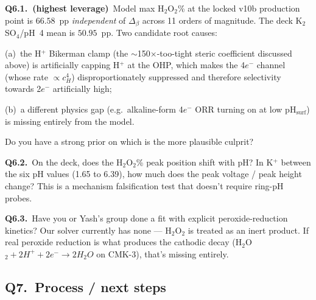 \documentclass[11pt]{article}
\begin{document}
\begin{questionbox}
\textbf{Q6.1.~(highest leverage)}~Model max H$_2$O$_2$\% at the
locked v10b production point is $66.58$~pp \emph{independent} of
$\Delta_\beta$ across 11 orders of magnitude.  The deck K$_2$SO$_4$/pH~4
mean is $50.95$~pp.  Two candidate root causes:

(a)~the H$^+$ Bikerman clamp (the $\sim$150$\times$-too-tight steric
coefficient discussed above) is artificially capping H$^+$ at the
OHP, which makes the 4$e^-$ channel (whose rate $\propto c_H^4$)
disproportionately suppressed and therefore selectivity towards
2$e^-$ artificially high;

(b)~a different physics gap (e.g.\ alkaline-form 4$e^-$ ORR turning
on at low pH$_{\mathrm{surf}}$) is missing entirely from the model.

Do you have a strong prior on which is the more plausible culprit?

\textbf{Q6.2.}~On the deck, does the H$_2$O$_2$\% peak position
shift with pH?  In K$^+$ between the six pH values (1.65 to 6.39),
how much does the peak voltage / peak height change?  This is a
mechanism falsification test that doesn't require ring-pH probes.

\textbf{Q6.3.}~Have you or Yash's group done a fit with explicit
peroxide-reduction kinetics?  Our solver currently has none ---
H$_2$O$_2$ is treated as an inert product.  If real peroxide
reduction is what produces the cathodic decay (H$_2$O$_2 + 2H^+ +
2e^-\to 2H_2O$ on CMK-3), that's missing entirely.
\end{questionbox}

\subsection*{Q7.\ Process / next steps}
\end{document}
